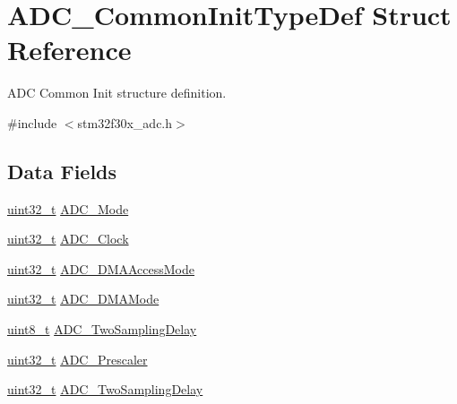 \hypertarget{struct_a_d_c___common_init_type_def}{\section{A\-D\-C\-\_\-\-Common\-Init\-Type\-Def Struct Reference}
\label{struct_a_d_c___common_init_type_def}
}


A\-D\-C Common Init structure definition.  




{\ttfamily \#include $<$stm32f30x\-\_\-adc.\-h$>$}

\subsection*{Data Fields}
\begin{DoxyCompactItemize}
\item 
\hyperlink{stdint_8h_a435d1572bf3f880d55459d9805097f62}{uint32\-\_\-t} \hyperlink{struct_a_d_c___common_init_type_def_a9ac2a96e9bbbec4b680ab250051a7b54}{A\-D\-C\-\_\-\-Mode}
\item 
\hyperlink{stdint_8h_a435d1572bf3f880d55459d9805097f62}{uint32\-\_\-t} \hyperlink{struct_a_d_c___common_init_type_def_ac1eb26eb45868dd0e85fbd65944f5275}{A\-D\-C\-\_\-\-Clock}
\item 
\hyperlink{stdint_8h_a435d1572bf3f880d55459d9805097f62}{uint32\-\_\-t} \hyperlink{struct_a_d_c___common_init_type_def_a421063e29be85798195ea5f2e6c26fbd}{A\-D\-C\-\_\-\-D\-M\-A\-Access\-Mode}
\item 
\hyperlink{stdint_8h_a435d1572bf3f880d55459d9805097f62}{uint32\-\_\-t} \hyperlink{struct_a_d_c___common_init_type_def_a43289ee35ebde4309c3b9d8c467d259c}{A\-D\-C\-\_\-\-D\-M\-A\-Mode}
\item 
\hyperlink{stdint_8h_aba7bc1797add20fe3efdf37ced1182c5}{uint8\-\_\-t} \hyperlink{struct_a_d_c___common_init_type_def_ad389f40f78d6856c0ea7e00583cbb0ff}{A\-D\-C\-\_\-\-Two\-Sampling\-Delay}
\item 
\hyperlink{stdint_8h_a435d1572bf3f880d55459d9805097f62}{uint32\-\_\-t} \hyperlink{struct_a_d_c___common_init_type_def_a4b968331be8f4a43ef31c18f4422df4b}{A\-D\-C\-\_\-\-Prescaler}
\item 
\hyperlink{stdint_8h_a435d1572bf3f880d55459d9805097f62}{uint32\-\_\-t} \hyperlink{struct_a_d_c___common_init_type_def_a2828abd59ed1777ae66c642d89be410e}{A\-D\-C\-\_\-\-Two\-Sampling\-Delay}
\end{DoxyCompactItemize}


